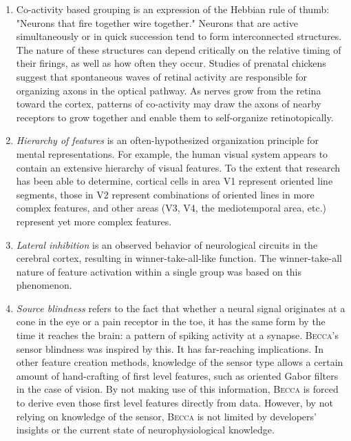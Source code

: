 \begin{enumerate}
\item Co-activity based grouping is an expression of the Hebbian rule of thumb: "Neurons that fire together wire together." Neurons that are active simultaneously or in quick succession tend to form interconnected structures. The nature of these structures can depend critically on the relative timing of their firings, as well as how often they occur. Studies of prenatal chickens suggest that spontaneous waves of retinal activity are responsible for organizing axons in the optical pathway. As nerves grow from the retina toward the cortex, patterns of co-activity may draw the axons of nearby receptors to grow together and enable them to self-organize retinotopically.

\item {\em Hierarchy of features} is an often-hypothesized organization principle for mental representations. For example, the human visual system appears to contain an extensive hierarchy of visual features. To the extent that research has been able to determine, cortical cells in area V1 represent oriented line segments, those in V2 represent combinations of oriented lines in more complex features, and other areas (V3, V4, the mediotemporal area, etc.) represent yet more complex features.

\item {\em Lateral inhibition} is an observed behavior of neurological circuits in the cerebral cortex, resulting in winner-take-all-like function. The winner-take-all nature of feature activation within a single group was based on this phenomenon.

\item {\em Source blindness} refers to the fact that whether a neural signal originates at a cone in the eye or a pain receptor in the toe, it has the same form by the time it reaches the brain: a pattern of spiking activity at a synapse. \textsc{Becca}'s sensor blindness was inspired by this. It has far-reaching implications. In other feature creation methods, knowledge of the sensor type allows a certain amount of hand-crafting of first level features, such as oriented Gabor filters in the case of vision. By not making use of this information, \textsc{Becca} is forced to derive even those first level features directly from data. However, by not relying on knowledge of the sensor, \textsc{Becca} is not limited by developers' insights or the current state of neurophysiological knowledge. 


\end{enumerate}
